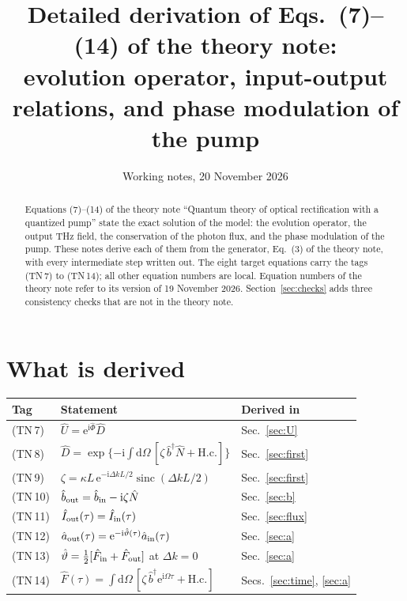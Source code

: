 \documentclass[aps,pra,onecolumn,notitlepage,11pt,amsmath,amssymb,nofootinbib]{revtex4-2}
\newcommand{\Nop}{\hat N}
\newcommand{\Iop}{\hat I}
\newcommand{\dd}{\mathrm{d}}
\newcommand{\ee}{\mathrm{e}}
\newcommand{\ii}{\mathrm{i}}
\newcommand{\sinc}{\operatorname{sinc}}
\begin{document}
\title{Detailed derivation of Eqs.~(7)--(14) of the theory note:\\
evolution operator, input-output relations, and phase modulation of the pump}
\author{Working notes, 20 November 2026}
\noaffiliation

\begin{abstract}
Equations (7)--(14) of the theory note ``Quantum theory of optical
rectification with a quantized pump'' state the exact solution of the model:
the evolution operator, the output THz field, the conservation of the photon
flux, and the phase modulation of the pump. These notes derive each of them
from the generator, Eq.~(3) of the theory note, with every intermediate step
written out. The eight target equations carry the tags (TN\,7) to (TN\,14);
all other equation numbers are local. Equation numbers of the theory note
refer to its version of 19 November 2026. Section~\ref{sec:checks} adds three
consistency checks that are not in the theory note.
\end{abstract}

\maketitle

\section{What is derived}

\begin{center}
\begin{tabular}{lll}
\hline\hline
Tag & Statement & Derived in\\
\hline
(TN\,7) & $\hat U=\ee^{\ii\hat\Phi}\hat D$ & Sec.~\ref{sec:U}\\
(TN\,8) & $\hat D=\exp\{-\ii\int\dd\Omega\,[\zeta\,\hat b^\dagger\Nop+\mathrm{H.c.}]\}$ & Sec.~\ref{sec:first}\\
(TN\,9) & $\zeta=\kappa L\,\ee^{-\ii\Delta kL/2}\sinc(\Delta kL/2)$ & Sec.~\ref{sec:first}\\
(TN\,10) & $\hat b_{\rm out}=\hat b_{\rm in}-\ii\zeta\Nop$ & Sec.~\ref{sec:b}\\
(TN\,11) & $\Iop_{\rm out}(\tau)=\Iop_{\rm in}(\tau)$ & Sec.~\ref{sec:flux}\\
(TN\,12) & $\hat a_{\rm out}(\tau)=\ee^{-\ii\hat\vartheta(\tau)}\hat a_{\rm in}(\tau)$ & Sec.~\ref{sec:a}\\
(TN\,13) & $\hat\vartheta=\tfrac12[\hat F_{\rm in}+\hat F_{\rm out}]$ at $\Delta k=0$ & Sec.~\ref{sec:a}\\
(TN\,14) & $\hat F(\tau)=\int\dd\Omega\,[\zeta\,\hat b^\dagger\ee^{\ii\Omega\tau}+\mathrm{H.c.}]$ & Secs.~\ref{sec:time}, \ref{sec:a}\\
\hline\hline
\end{tabular}
\end{center}
\end{document}
